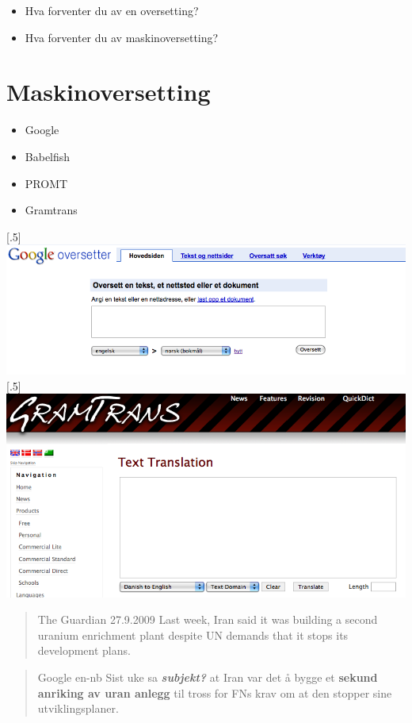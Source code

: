 \documentclass[a4paper,english,12pt]{article}
\begin{document}
\begin{spacing}{1.0}
\begin{itemize}
\item Hva forventer du av en oversetting?
\item Hva forventer du av maskinoversetting?
\end{itemize}


\section{Maskinoversetting}

\begin{itemize}
\item Google
\item Babelfish
\item PROMT
\item Gramtrans
\end{itemize}


\scalebox{.5}[.5]{\includegraphics{google.png}} \\
\scalebox{.5}[.5]{\includegraphics{gramtrans.png}}


\begin{quote}{The Guardian 27.9.2009}
Last week, Iran said it was building a second uranium enrichment plant despite UN demands that it stops its development plans.
\end{quote}  

\begin{quote}{Google en-nb}
Sist uke sa \textit{\textbf{subjekt?}} at Iran var det å bygge et \textbf{sekund} \textbf{anriking av uran anlegg} til tross for FNs krav om at den stopper sine utviklingsplaner.
\end{quote}  


\end{spacing}
\end{document}
